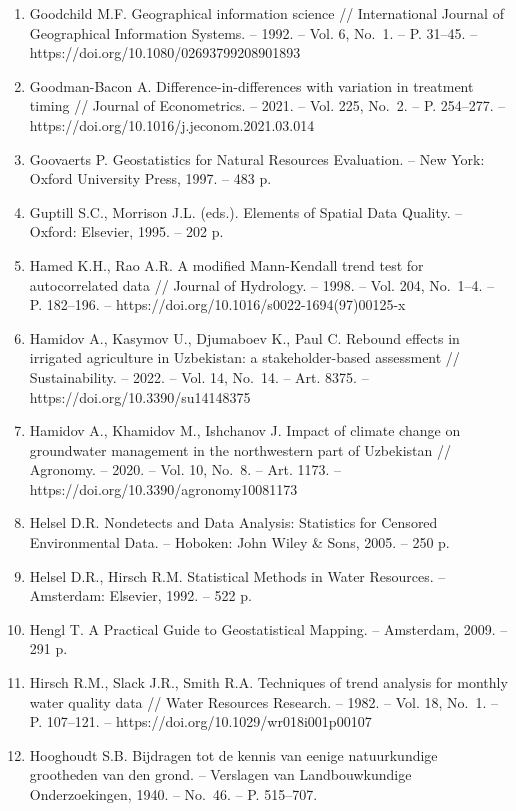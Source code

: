 \begin{enumerate}
\item
  Goodchild M.F. Geographical information science // International
  Journal of Geographical Information Systems. -- 1992. -- Vol. 6,
  No.~1. -- P. 31--45. -- https://doi.org/10.1080/02693799208901893
\item
  Goodman-Bacon A. Difference-in-differences with variation in treatment
  timing // Journal of Econometrics. -- 2021. -- Vol. 225, No.~2. -- P.
  254--277. -- https://doi.org/10.1016/j.jeconom.2021.03.014
\item
  Goovaerts P. Geostatistics for Natural Resources Evaluation. -- New
  York: Oxford University Press, 1997. -- 483 p.
\item
  Guptill S.C., Morrison J.L. (eds.). Elements of Spatial Data Quality.
  -- Oxford: Elsevier, 1995. -- 202 p.
\item
  Hamed K.H., Rao A.R. A modified Mann-Kendall trend test for
  autocorrelated data // Journal of Hydrology. -- 1998. -- Vol. 204,
  No.~1--4. -- P. 182--196. --
  https://doi.org/10.1016/s0022-1694(97)00125-x
\item
  Hamidov A., Kasymov U., Djumaboev K., Paul C. Rebound effects in
  irrigated agriculture in Uzbekistan: a stakeholder-based assessment //
  Sustainability. -- 2022. -- Vol. 14, No.~14. -- Art. 8375. --
  https://doi.org/10.3390/su14148375
\item
  Hamidov A., Khamidov M., Ishchanov J. Impact of climate change on
  groundwater management in the northwestern part of Uzbekistan //
  Agronomy. -- 2020. -- Vol. 10, No.~8. -- Art. 1173. --
  https://doi.org/10.3390/agronomy10081173
\item
  Helsel D.R. Nondetects and Data Analysis: Statistics for Censored
  Environmental Data. -- Hoboken: John Wiley \& Sons, 2005. -- 250 p.
\item
  Helsel D.R., Hirsch R.M. Statistical Methods in Water Resources. --
  Amsterdam: Elsevier, 1992. -- 522 p.
\item
  Hengl T. A Practical Guide to Geostatistical Mapping. -- Amsterdam,
  2009. -- 291 p.
\item
  Hirsch R.M., Slack J.R., Smith R.A. Techniques of trend analysis for
  monthly water quality data // Water Resources Research. -- 1982. --
  Vol. 18, No.~1. -- P. 107--121. --
  https://doi.org/10.1029/wr018i001p00107
\item
  Hooghoudt S.B. Bijdragen tot de kennis van eenige natuurkundige
  grootheden van den grond. -- Verslagen van Landbouwkundige
  Onderzoekingen, 1940. -- No.~46. -- P. 515--707.

\end{enumerate}
